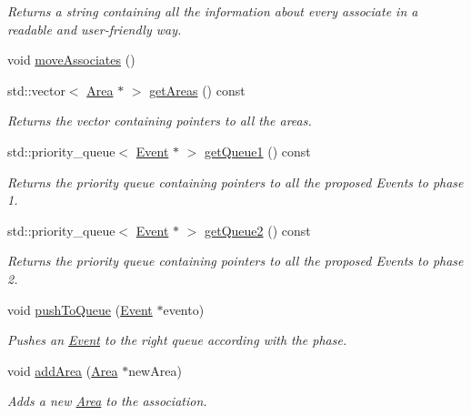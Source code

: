 \begin{DoxyCompactItemize}
\begin{DoxyCompactList}\small\item\em Returns a string containing all the information about every associate in a readable and user-\/friendly way. \end{DoxyCompactList}\item 
void \mbox{\hyperlink{classAssociation_ae3c5683c5fb9d62f5bf2b9d38be3c8dc}{move\+Associates}} ()
\item 
std\+::vector$<$ \mbox{\hyperlink{classArea}{Area}} $\ast$ $>$ \mbox{\hyperlink{classAssociation_a46f83e00e0201f25129a5c8167969661}{get\+Areas}} () const
\begin{DoxyCompactList}\small\item\em Returns the vector containing pointers to all the areas. \end{DoxyCompactList}\item 
std\+::priority\+\_\+queue$<$ \mbox{\hyperlink{classEvent}{Event}} $\ast$ $>$ \mbox{\hyperlink{classAssociation_a595bd9c5abaf1ceaa62ac8fb70d359c6}{get\+Queue1}} () const
\begin{DoxyCompactList}\small\item\em Returns the priority queue containing pointers to all the proposed Events to phase 1. \end{DoxyCompactList}\item 
std\+::priority\+\_\+queue$<$ \mbox{\hyperlink{classEvent}{Event}} $\ast$ $>$ \mbox{\hyperlink{classAssociation_a1600f284c97b98836cac69fc4b21d5f6}{get\+Queue2}} () const
\begin{DoxyCompactList}\small\item\em Returns the priority queue containing pointers to all the proposed Events to phase 2. \end{DoxyCompactList}\item 
void \mbox{\hyperlink{classAssociation_aaf6b3eabb3b20c31a56f69913cb3fdb3}{push\+To\+Queue}} (\mbox{\hyperlink{classEvent}{Event}} $\ast$evento)
\begin{DoxyCompactList}\small\item\em Pushes an \mbox{\hyperlink{classEvent}{Event}} to the right queue according with the phase. \end{DoxyCompactList}\item 
void \mbox{\hyperlink{classAssociation_a33ebf26ce910d02ce8a702e4ff86551b}{add\+Area}} (\mbox{\hyperlink{classArea}{Area}} $\ast$new\+Area)
\begin{DoxyCompactList}\small\item\em Adds a new \mbox{\hyperlink{classArea}{Area}} to the association. \end{DoxyCompactList}\item 

\end{DoxyCompactItemize}
